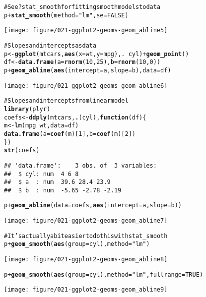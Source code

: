 \documentclass[a4paper,titlepage]{tufte-handout}\usepackage{graphicx, color}
\makeatletter
\def\maxwidth{ %
  \ifdim\Gin@nat@width>\linewidth
    \linewidth
  \else
    \Gin@nat@width
  \fi
}
\newcommand{\hlfunctioncall}[1]{\textcolor[rgb]{0.501960784313725,0,0.329411764705882}{\textbf{#1}}}%
\newcommand{\hlstring}[1]{\textcolor[rgb]{0.6,0.6,1}{#1}}%
\newcommand{\hlcomment}[1]{\textcolor[rgb]{0.180392156862745,0.6,0.341176470588235}{#1}}%
\newenvironment{kframe}{%
 \def\at@end@of@kframe{}%
 \ifinner\ifhmode%
  \def\at@end@of@kframe{\end{minipage}}%
  \begin{minipage}{\columnwidth}%
 \fi\fi%
 \def\FrameCommand##1{\hskip\@totalleftmargin \hskip-\fboxsep
 \colorbox{shadecolor}{##1}\hskip-\fboxsep
     \hskip-\linewidth \hskip-\@totalleftmargin \hskip\columnwidth}%
 \MakeFramed {\advance\hsize-\width
   \@totalleftmargin\z@ \linewidth\hsize
   \@setminipage}}%
 {\par\unskip\endMakeFramed%
 \at@end@of@kframe}
\newenvironment{knitrout}{}{} %
\makeatother
\begin{document}
\begin{knitrout}
\begin{kframe}
\begin{alltt}
\hlcomment{# See ?stat_smooth for fitting smooth models to data}
p + \hlfunctioncall{stat_smooth}(method=\hlstring{"lm"}, se=FALSE)
\end{alltt}
\end{kframe}
\texttt{[image: figure/021-ggplot2-geoms-geom\_abline5]} 
\begin{kframe}\begin{alltt}

\hlcomment{# Slopes and intercepts as data}
p <- \hlfunctioncall{ggplot}(mtcars, \hlfunctioncall{aes}(x = wt, y=mpg), . ~ cyl) + \hlfunctioncall{geom_point}()
df <- \hlfunctioncall{data.frame}(a=\hlfunctioncall{rnorm}(10, 25), b=\hlfunctioncall{rnorm}(10, 0))
p + \hlfunctioncall{geom_abline}(\hlfunctioncall{aes}(intercept=a, slope=b), data=df)
\end{alltt}
\end{kframe}
\texttt{[image: figure/021-ggplot2-geoms-geom\_abline6]} 
\begin{kframe}\begin{alltt}

\hlcomment{# Slopes and intercepts from linear model}
\hlfunctioncall{library}(plyr)
coefs <- \hlfunctioncall{ddply}(mtcars, \hlfunctioncall{.}(cyl), \hlfunctioncall{function}(df) \{
  m <- \hlfunctioncall{lm}(mpg ~ wt, data=df)
  \hlfunctioncall{data.frame}(a = \hlfunctioncall{coef}(m)[1], b = \hlfunctioncall{coef}(m)[2])
\})
\hlfunctioncall{str}(coefs)
\end{alltt}
\begin{verbatim}
## 'data.frame':	3 obs. of  3 variables:
##  $ cyl: num  4 6 8
##  $ a  : num  39.6 28.4 23.9
##  $ b  : num  -5.65 -2.78 -2.19
\end{verbatim}
\begin{alltt}
p + \hlfunctioncall{geom_abline}(data=coefs, \hlfunctioncall{aes}(intercept=a, slope=b))
\end{alltt}
\end{kframe}
\texttt{[image: figure/021-ggplot2-geoms-geom\_abline7]} 
\begin{kframe}\begin{alltt}

\hlcomment{# It's actually a bit easier to do this with stat_smooth}
p + \hlfunctioncall{geom_smooth}(\hlfunctioncall{aes}(group=cyl), method=\hlstring{"lm"})
\end{alltt}
\end{kframe}
\texttt{[image: figure/021-ggplot2-geoms-geom\_abline8]} 
\begin{kframe}\begin{alltt}
p + \hlfunctioncall{geom_smooth}(\hlfunctioncall{aes}(group=cyl), method=\hlstring{"lm"}, fullrange=TRUE)
\end{alltt}
\end{kframe}
\texttt{[image: figure/021-ggplot2-geoms-geom\_abline9]} 
\begin{kframe}\begin{alltt}


\end{alltt}
\end{kframe}
\end{knitrout}
\end{document}

